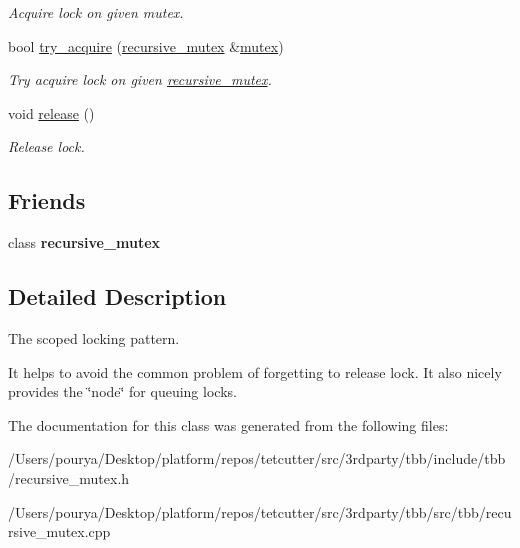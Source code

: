 \begin{DoxyCompactItemize}
\begin{DoxyCompactList}\small\item\em Acquire lock on given mutex. \end{DoxyCompactList}\item 
\hypertarget{classtbb_1_1recursive__mutex_1_1scoped__lock_a160bba506f4033980ddb69ab7a02c4fb}{}bool \hyperlink{classtbb_1_1recursive__mutex_1_1scoped__lock_a160bba506f4033980ddb69ab7a02c4fb}{try\+\_\+acquire} (\hyperlink{classtbb_1_1recursive__mutex}{recursive\+\_\+mutex} \&\hyperlink{classtbb_1_1mutex}{mutex})\label{classtbb_1_1recursive__mutex_1_1scoped__lock_a160bba506f4033980ddb69ab7a02c4fb}

\begin{DoxyCompactList}\small\item\em Try acquire lock on given \hyperlink{classtbb_1_1recursive__mutex}{recursive\+\_\+mutex}. \end{DoxyCompactList}\item 
\hypertarget{classtbb_1_1recursive__mutex_1_1scoped__lock_a2fe3246ffc26bdb5a58f33ca513b6c0f}{}void \hyperlink{classtbb_1_1recursive__mutex_1_1scoped__lock_a2fe3246ffc26bdb5a58f33ca513b6c0f}{release} ()\label{classtbb_1_1recursive__mutex_1_1scoped__lock_a2fe3246ffc26bdb5a58f33ca513b6c0f}

\begin{DoxyCompactList}\small\item\em Release lock. \end{DoxyCompactList}\end{DoxyCompactItemize}
\subsection*{Friends}
\begin{DoxyCompactItemize}
\item 
\hypertarget{classtbb_1_1recursive__mutex_1_1scoped__lock_a1bdb637fe5c9412323bf92846b40682e}{}class {\bfseries recursive\+\_\+mutex}\label{classtbb_1_1recursive__mutex_1_1scoped__lock_a1bdb637fe5c9412323bf92846b40682e}

\end{DoxyCompactItemize}


\subsection{Detailed Description}
The scoped locking pattern. 

It helps to avoid the common problem of forgetting to release lock. It also nicely provides the \char`\"{}node\char`\"{} for queuing locks. 

The documentation for this class was generated from the following files\+:\begin{DoxyCompactItemize}
\item 
/\+Users/pourya/\+Desktop/platform/repos/tetcutter/src/3rdparty/tbb/include/tbb/recursive\+\_\+mutex.\+h\item 
/\+Users/pourya/\+Desktop/platform/repos/tetcutter/src/3rdparty/tbb/src/tbb/recursive\+\_\+mutex.\+cpp\end{DoxyCompactItemize}
